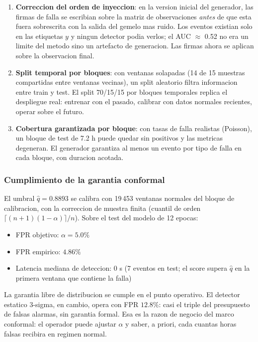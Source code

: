 \begin{enumerate}[leftmargin=*,itemsep=2pt]
  \item \textbf{Correccion del orden de inyeccion}: en la version
        inicial del generador, las firmas de falla se escribian sobre
        la matriz de observaciones \emph{antes} de que esta fuera
        sobrescrita con la salida del gemelo mas ruido. Los eventos
        existian solo en las etiquetas $y$ y ningun detector podia
        verlos; el AUC $\approx$ 0.52 no era un limite del metodo
        sino un artefacto de generacion. Las firmas ahora se aplican
        sobre la observacion final.
  \item \textbf{Split temporal por bloques}: con ventanas solapadas
        (14 de 15 muestras compartidas entre ventanas vecinas), un
        split aleatorio filtra informacion entre train y test. El
        split 70/15/15 por bloques temporales replica el despliegue
        real: entrenar con el pasado, calibrar con datos normales
        recientes, operar sobre el futuro.
  \item \textbf{Cobertura garantizada por bloque}: con tasas de
        falla realistas (Poisson), un bloque de test de 7.2 h puede
        quedar sin positivos y las metricas degeneran. El generador
        garantiza al menos un evento por tipo de falla en cada
        bloque, con duracion acotada.
\end{enumerate}

\subsubsection{Cumplimiento de la garantia conformal}

El umbral $\hat{q} = 0.8893$ se calibra con 19\,453 ventanas
normales del bloque de calibracion, con la correccion de muestra
finita (cuantil de orden $\lceil (n+1)(1-\alpha) \rceil / n$).
Sobre el test del modelo de 12 epocas:

\begin{itemize}[leftmargin=*,itemsep=2pt]
  \item FPR objetivo: $\alpha = 5.0\%$
  \item FPR empirico: $4.86\%$
  \item Latencia mediana de deteccion: $0$ s (7 eventos en test;
        el score supera $\hat{q}$ en la primera ventana que contiene
        la falla)
\end{itemize}

La garantia libre de distribucion se cumple en el punto operativo.
El detector estatico 3-sigma, en cambio, opera con FPR $12.8\%$:
casi el triple del presupuesto de falsas alarmas, sin garantia
formal. Esa es la razon de negocio del marco conformal: el operador
puede ajustar $\alpha$ y saber, a priori, cada cuantas horas
falsas recibira en regimen normal.

